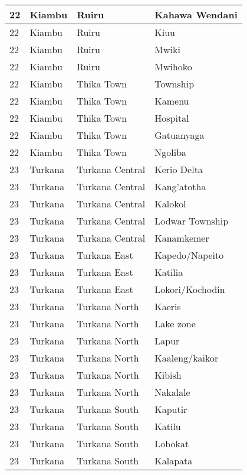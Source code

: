 \begin{table}[!ht]
\begin{tabular}{|l|l|l|l|}
        22 & Kiambu & Ruiru & Kahawa Wendani \\ \hline
        22 & Kiambu & Ruiru & Kiuu \\ \hline
        22 & Kiambu & Ruiru & Mwiki \\ \hline
        22 & Kiambu & Ruiru & Mwihoko \\ \hline
        22 & Kiambu & Thika Town & Township \\ \hline
        22 & Kiambu & Thika Town & Kamenu \\ \hline
        22 & Kiambu & Thika Town & Hospital \\ \hline
        22 & Kiambu & Thika Town & Gatuanyaga \\ \hline
        22 & Kiambu & Thika Town & Ngoliba \\ \hline
        23 & Turkana & Turkana Central & Kerio Delta \\ \hline
        23 & Turkana & Turkana Central & Kang’atotha \\ \hline
        23 & Turkana & Turkana Central & Kalokol \\ \hline
        23 & Turkana & Turkana Central & Lodwar Township \\ \hline
        23 & Turkana & Turkana Central & Kanamkemer \\ \hline
        23 & Turkana & Turkana East & Kapedo/Napeito \\ \hline
        23 & Turkana & Turkana East & Katilia \\ \hline
        23 & Turkana & Turkana East & Lokori/Kochodin \\ \hline
        23 & Turkana & Turkana North & Kaeris \\ \hline
        23 & Turkana & Turkana North & Lake zone \\ \hline
        23 & Turkana & Turkana North & Lapur \\ \hline
        23 & Turkana & Turkana North & Kaaleng/kaikor \\ \hline
        23 & Turkana & Turkana North & Kibish \\ \hline
        23 & Turkana & Turkana North & Nakalale \\ \hline
        23 & Turkana & Turkana South & Kaputir \\ \hline
        23 & Turkana & Turkana South & Katilu \\ \hline
        23 & Turkana & Turkana South & Lobokat \\ \hline
        23 & Turkana & Turkana South & Kalapata \\ \hline

\end{tabular}
\end{table}
